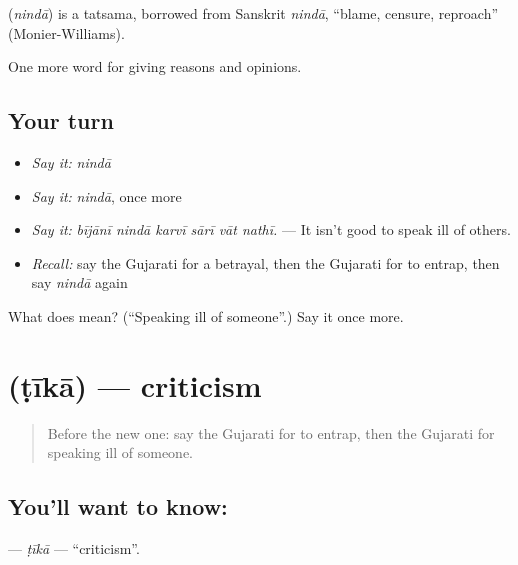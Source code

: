 \begin{cousinweb}
\textbf{} (\emph{nindā}) is a tatsama, borrowed from Sanskrit \emph{nindā}, \textquotedblleft{}blame, censure, reproach\textquotedblright{} (Monier-Williams).
\end{cousinweb}

\begin{grammarlens}[title={What you've built}]
One more word for giving reasons and opinions.
\end{grammarlens}

\subsection*{Your turn}
\begin{itemize}
\raggedright
  \item \emph{Say it:} \emph{nindā}
  \item \emph{Say it:} \emph{nindā}, once more
  \item \emph{Say it:} \emph{bījānī nindā karvī sārī vāt nathī.} — It isn't good to speak ill of others.
  \item \emph{Recall:} say the Gujarati for a betrayal, then the Gujarati for to entrap, then say \emph{nindā} again
\end{itemize}

\begin{tcolorbox}[breakable,colback=teal!4,colframe=teal!35!black,title={Before you move on}]
What does  mean? (\textquotedblleft{}Speaking ill of someone\textquotedblright{}.) Say it once more.
\end{tcolorbox}
\section[\texorpdfstring{\gu{ટીકા} (ṭīkā)}{ટીકા (ṭīkā)}]{ (ṭīkā) — criticism}

\label{lesson:GU-C361-tika}



\begin{quote}
Before the new one: say the Gujarati for to entrap, then the Gujarati for speaking ill of someone.
\end{quote}

\subsection*{You'll want to know: }
\textbf{} — \emph{ṭīkā} — \textquotedblleft{}criticism\textquotedblright{}.

